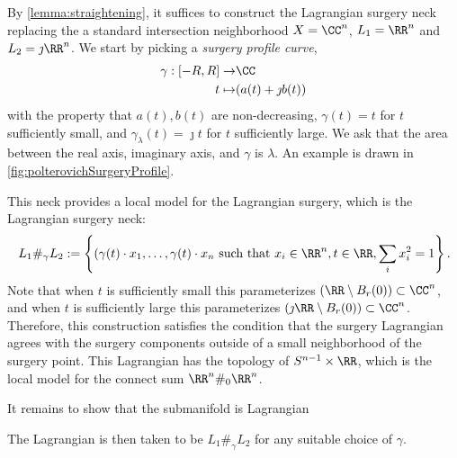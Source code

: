 
 
 

By \cref{lemma:straightening}, it suffices to construct the Lagrangian surgery neck replacing the a standard intersection neighborhood $X=\CC^n$, $L_1=\RR^n$ and $L_2=\jmath\RR^n$.
We start by picking a \emph{surgery profile curve},  
\begin{align*}
      \gamma: [-R, R] \to& \CC\\
      t\mapsto& (a(t)+\jmath b(t))
\end{align*}
with the property that $a(t), b(t)$ are non-decreasing, $\gamma(t)=t$ for $t$ sufficiently small, and $\gamma_\lambda(t)=\jmath t$ for $t$ sufficiently large. We ask that the area between the real axis, imaginary axis, and $\gamma$ is $\lambda$.
An example is drawn in \cref{fig:polterovichSurgeryProfile}.

This neck provides a local model for the Lagrangian surgery, which is the Lagrangian surgery neck:
\[
	L_1\#_\gamma L_2:=\left\{(\gamma(t)\cdot x_1,\ldots,  \gamma(t)\cdot x_n \text{ such that } x_i \in \RR^n,t\in \RR, \sum_{i} x_i^2=1\right\}.
\]
Note that when $t$ is sufficiently small this parameterizes $(\RR\setminus B_r(0))\subset \CC^n$, and when $t$ is sufficiently large this parameterizes $(\jmath \RR \setminus B_r(0))\subset \CC^n$. 
Therefore, this construction satisfies the condition that the surgery Lagrangian agrees with the surgery components outside of a small neighborhood of the surgery point.
This Lagrangian has the topology of $S^{n-1}\times \RR$, which is the local model for the connect sum $\RR^n\#_0\RR^n$.

It remains to show that the submanifold is Lagrangian \todo{}


The Lagrangian is then taken to be $L_1\#_\gamma L_2$ for any suitable choice of $\gamma$.
 